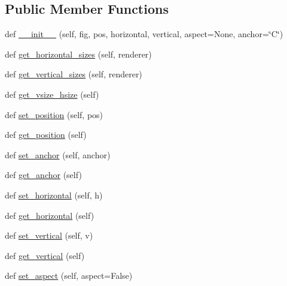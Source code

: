 \subsection*{Public Member Functions}
\begin{DoxyCompactItemize}
\item 
def \hyperlink{classaxes__grid1_1_1axes__divider_1_1Divider_af36be90f43cba49ff444e0e17969c109}{\+\_\+\+\_\+init\+\_\+\+\_\+} (self, fig, pos, horizontal, vertical, aspect=None, anchor=\char`\"{}C\char`\"{})
\item 
def \hyperlink{classaxes__grid1_1_1axes__divider_1_1Divider_a67a0a517015a79bbad4ef37eea9078f7}{get\+\_\+horizontal\+\_\+sizes} (self, renderer)
\item 
def \hyperlink{classaxes__grid1_1_1axes__divider_1_1Divider_ac7a9e29721498bed0af09f4db1826d99}{get\+\_\+vertical\+\_\+sizes} (self, renderer)
\item 
def \hyperlink{classaxes__grid1_1_1axes__divider_1_1Divider_ac20ffb7459b60051144f2a018ac5fe96}{get\+\_\+vsize\+\_\+hsize} (self)
\item 
def \hyperlink{classaxes__grid1_1_1axes__divider_1_1Divider_a3a7fbea2dccb379c8d4b32cfebc25dab}{set\+\_\+position} (self, pos)
\item 
def \hyperlink{classaxes__grid1_1_1axes__divider_1_1Divider_af09866876b81aad7b6010da88a07a733}{get\+\_\+position} (self)
\item 
def \hyperlink{classaxes__grid1_1_1axes__divider_1_1Divider_afe00e87b9a083c9d6bb5bb2ac69d95d2}{set\+\_\+anchor} (self, anchor)
\item 
def \hyperlink{classaxes__grid1_1_1axes__divider_1_1Divider_af192c947a7776fe33aac8dd1adf2ade6}{get\+\_\+anchor} (self)
\item 
def \hyperlink{classaxes__grid1_1_1axes__divider_1_1Divider_a490d0e4e310c57c497614ed6b17fd2c2}{set\+\_\+horizontal} (self, h)
\item 
def \hyperlink{classaxes__grid1_1_1axes__divider_1_1Divider_ad1290b308a35cba52e4128f6362e46bf}{get\+\_\+horizontal} (self)
\item 
def \hyperlink{classaxes__grid1_1_1axes__divider_1_1Divider_a29de33914fc9161ce56c4b3942f3573f}{set\+\_\+vertical} (self, v)
\item 
def \hyperlink{classaxes__grid1_1_1axes__divider_1_1Divider_a3691310421a1c316d2b286512fc78b53}{get\+\_\+vertical} (self)
\item 
def \hyperlink{classaxes__grid1_1_1axes__divider_1_1Divider_a05ef4b0d3d24ce059f0d7f5b627e314a}{set\+\_\+aspect} (self, aspect=False)

\end{DoxyCompactItemize}

